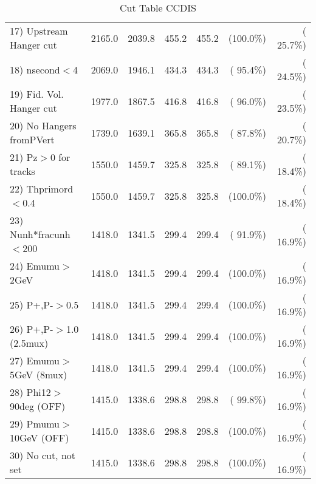 \begin{table}[h!]
\begin{tabular}{||l||r|r|r|r|r|r||}
 17) Upstream Hanger cut  &       2165.0 &       2039.8 &        455.2 &        455.2 & (100.0\%) & ( 25.7\%) \\
 18) nsecond$<$4          &       2069.0 &       1946.1 &        434.3 &        434.3 & ( 95.4\%) & ( 24.5\%) \\
 19) Fid. Vol. Hanger cut &       1977.0 &       1867.5 &        416.8 &        416.8 & ( 96.0\%) & ( 23.5\%) \\
 20) No Hangers fromPVert &       1739.0 &       1639.1 &        365.8 &        365.8 & ( 87.8\%) & ( 20.7\%) \\
 21) Pz$>$0 for tracks    &       1550.0 &       1459.7 &        325.8 &        325.8 & ( 89.1\%) & ( 18.4\%) \\
 22) Thprimord$<$0.4      &       1550.0 &       1459.7 &        325.8 &        325.8 & (100.0\%) & ( 18.4\%) \\
 23) Nunh*fracunh$<$200   &       1418.0 &       1341.5 &        299.4 &        299.4 & ( 91.9\%) & ( 16.9\%) \\
 24) Emumu$>$2GeV         &       1418.0 &       1341.5 &        299.4 &        299.4 & (100.0\%) & ( 16.9\%) \\
 25) P+,P-$>$0.5          &       1418.0 &       1341.5 &        299.4 &        299.4 & (100.0\%) & ( 16.9\%) \\
 26) P+,P-$>$1.0 (2.5mux) &       1418.0 &       1341.5 &        299.4 &        299.4 & (100.0\%) & ( 16.9\%) \\
 27) Emumu$>$5GeV  (8mux) &       1418.0 &       1341.5 &        299.4 &        299.4 & (100.0\%) & ( 16.9\%) \\
 28) Phi12$>$90deg  (OFF) &       1415.0 &       1338.6 &        298.8 &        298.8 & ( 99.8\%) & ( 16.9\%) \\
 29) Pmumu$>$10GeV  (OFF) &       1415.0 &       1338.6 &        298.8 &        298.8 & (100.0\%) & ( 16.9\%) \\
 30) No cut, not set      &       1415.0 &       1338.6 &        298.8 &        298.8 & (100.0\%) & ( 16.9\%) \\
 \hline
 \hline
 \end{tabular}
 \caption{Cut Table  CCDIS    }
 \label{tab-cutcohjpsi-mumu_ncdis}
 \end{table}
